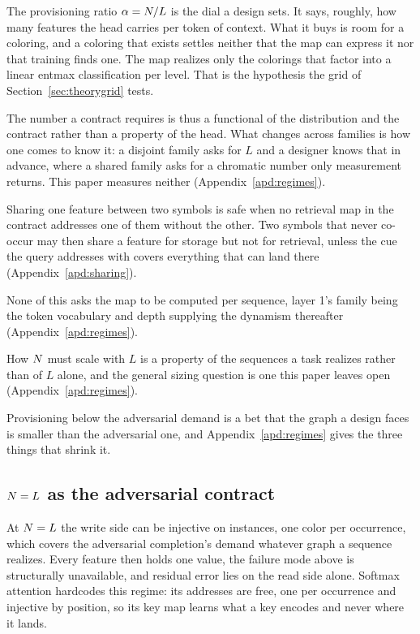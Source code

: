 The provisioning ratio $\alpha = N / L$ is the dial a design sets. It says, roughly, how many features the head carries per token of context. What it buys is room for a coloring, and a coloring that exists settles neither that the map can express it nor that training finds one. The map realizes only the colorings that factor into a linear entmax classification per level. That is the hypothesis the grid of Section~\ref{sec:theorygrid} tests.

The number a contract requires is thus a functional of the distribution and the contract rather than a property of the head. What changes across families is how one comes to know it: a disjoint family asks for $L$ and a designer knows that in advance, where a shared family asks for a chromatic number only measurement returns. This paper measures neither (Appendix~\ref{apd:regimes}).

Sharing one feature between two symbols is safe when no retrieval map in the contract addresses one of them without the other. Two symbols that never co-occur may then share a feature for storage but not for retrieval, unless the cue the query addresses with covers everything that can land there (Appendix~\ref{apd:sharing}).

None of this asks the map to be computed per sequence, layer 1's family being the token vocabulary and depth supplying the dynamism thereafter (Appendix~\ref{apd:regimes}).

How $N$ must scale with $L$ is a property of the sequences a task realizes rather than of $L$ alone, and the general sizing question is one this paper leaves open (Appendix~\ref{apd:regimes}).


Provisioning below the adversarial demand is a bet that the graph a design faces is smaller than the adversarial one, and Appendix~\ref{apd:regimes} gives the three things that shrink it.



\subsection{$N = L$ as the adversarial contract}
\label{sec:corner}

At $N = L$ the write side can be injective on instances, one color per occurrence, which covers the adversarial completion's demand whatever graph a sequence realizes. Every feature then holds one value, the failure mode above is structurally unavailable, and residual error lies on the read side alone. Softmax attention hardcodes this regime: its addresses are free, one per occurrence and injective by position, so its key map learns what a key encodes and never where it lands.


